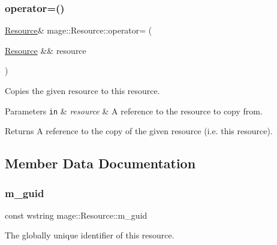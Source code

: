 \subsubsection{\texorpdfstring{operator=()}{operator=()}\hspace{0.1cm}{\footnotesize\ttfamily [2/2]}}
{\footnotesize\ttfamily \hyperlink{classmage_1_1_resource}{Resource}\& mage\+::\+Resource\+::operator= (\begin{DoxyParamCaption}\item[{\hyperlink{classmage_1_1_resource}{Resource} \&\&}]{resource }\end{DoxyParamCaption})\hspace{0.3cm}{\ttfamily [delete]}}

Copies the given resource to this resource.


\begin{DoxyParams}[1]{Parameters}
\mbox{\tt in}  & {\em resource} & A reference to the resource to copy from. \\
\hline
\end{DoxyParams}
\begin{DoxyReturn}{Returns}
A reference to the copy of the given resource (i.\+e. this resource). 
\end{DoxyReturn}


\subsection{Member Data Documentation}
\hypertarget{classmage_1_1_resource_aa5e176b2528581bf1b662f5a77aeef40}{}\label{classmage_1_1_resource_aa5e176b2528581bf1b662f5a77aeef40} 
\subsubsection{\texorpdfstring{m\+\_\+guid}{m\_guid}}
{\footnotesize\ttfamily const wstring mage\+::\+Resource\+::m\+\_\+guid\hspace{0.3cm}{\ttfamily [private]}}

The globally unique identifier of this resource. 